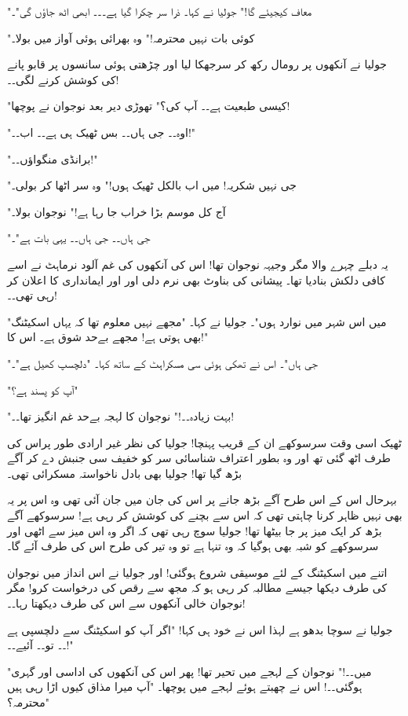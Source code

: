 "معاف کیجیئے گا!" جولیا نے کہا۔ ذرا سر چکرا گیا ہے۔۔۔ ابھی اٹھ جاؤں گی"۔

"کوئی بات نہیں محترمہ!" وہ بھرائی ہوئی آواز میں بولا۔

جولیا نے آنکھوں پر رومال رکھ کر سرجھکا لیا اور چڑھتی ہوئی سانسوں پر قابو پانے کی کوشش کرنے لگی۔۔!

"کیسی طبعیت ہے۔۔ آپ کی؟" تھوڑی دیر بعد نوجوان نے پوچھا!

"اوہ۔۔ جی ہاں۔۔ بس ٹھیک ہی ہے۔۔ اب۔۔!"

"برانڈی منگواؤں۔۔!"

"جی نہیں شکریہ! میں اب بالکل ٹھیک ہوں!" وہ سر اٹھا کر بولی۔

"آج کل موسم بڑا خراب جا رہا ہے!" نوجوان بولا۔

"جی ہاں۔۔ جی ہاں۔۔ یہی بات ہے"۔

یہ دبلے چہرے والا مگر وجیہہ نوجوان تھا! اس کی آنکھوں کی غم آلود نرماہٹ نے اسے کافی دلکش بنادیا تھا۔ پیشانی کی بناوٹ بھی نرم دلی اور اور ایمانداری کا اعلان کر رہی تھی۔۔!

"میں اس شہر میں نوارد ہوں"۔ جولیا نے کہا۔ "مجھے نہیں معلوم تھا کہ یہاں اسکیٹنگ بھی ہوتی ہے! مجھے بےحد شوق ہے۔ اس کا!"

"جی ہاں"۔ اس نے تھکی ہوئی سی مسکراہٹ کے ساتھ کہا۔ "دلچسپ کھیل ہے"۔

"آپ کو پسند ہے؟"

"بہت زیادہ۔۔!" نوجوان کا لہجہ بےحد غم انگیز تھا۔۔!

ٹھیک اسی وقت سرسوکھے ان کے قریب پہنچا! جولیا کی نظر غیر ارادی طور پراس کی طرف اٹھ گئی تھ اور وہ بطور اعتراف شناسائی سر کو خفیف سی جنبش دے کر آگے بڑھ گیا تھا! جولیا بھی بادل ناخواستہ مسکرائی تھی۔

بہرحال اس کے اس طرح آگے بڑھ جانے پر اس کی جان میں جان آئی تھی وہ اس پر یہ بھی نہیں ظاہر کرنا چاہتی تھی کہ اس سے بچنے کی کوشش کر رہی ہے! سرسوکھے آگے بڑھ کر ایک میز پر جا بیٹھا تھا! جولیا سوچ رہی تھی کہ اگر وہ اس میز سے اٹھی اور سرسوکھے کو شبہ بھی ہوگیا کہ وہ تنہا ہے تو وہ تیر کی طرح اس کی طرف آئے گا۔

اتنے میں اسکیٹنگ کے لئے موسیقی شروع ہوگئی! اور جولیا نے اس انداز میں نوجوان کی طرف دیکھا جیسے مطالبہ کر رہی ہو کہ مجھ سے رقص کی درخواست کرو! مگر نوجوان خالی آنکھوں سے اس کی طرف دیکھتا رہا۔۔!

جولیا نے سوچا بدھو ہے لہذا اس نے خود ہی کہا! "اگر آپ کو اسکیٹنگ سے دلچسپی ہے ۔۔ تو۔۔ آئیے۔۔!"

"میں۔۔!" نوجوان کے لہجے میں تحیر تھا! پھر اس کی آنکھوں کی اداسی اور گہری ہوگئی۔۔! اس نے چھبتے ہوئے لہجے میں پوچھا۔ "آپ میرا مذاق کیوں اڑا رہی ہیں محترمہ؟"

